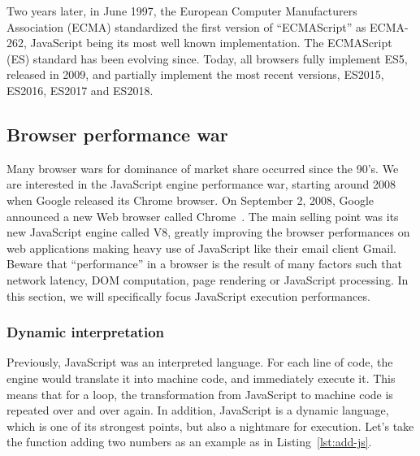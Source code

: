 Two years later, in June 1997, the European Computer Manufacturers Association
(ECMA) standardized the first version of ``ECMAScript'' as ECMA-262,
JavaScript being its most well known implementation.
The ECMAScript (ES) standard has been evolving since.
Today, all browsers fully implement ES5, released in 2009,
and partially implement the most recent versions, ES2015,
ES2016, ES2017 and ES2018.

\subsection{Browser performance war}%
\label{sub:browser_performance_war}

Many browser wars for dominance of market share occurred since the 90's.
We are interested in the JavaScript engine performance war,
starting around 2008 when Google released its Chrome browser.
On September 2, 2008, Google announced a new Web browser called Chrome~\cite{google-chrome}.
The main selling point was its new JavaScript engine called V8,
greatly improving the browser performances on web applications making
heavy use of JavaScript like their email client Gmail.
Beware that ``performance'' in a browser is the result of many factors
such that network latency, DOM computation, page rendering or JavaScript processing.
In this section, we will specifically focus JavaScript execution performances.

\subsubsection{Dynamic interpretation}%
\label{ssub:dynamic-interpretation}

Previously, JavaScript was an interpreted language.
For each line of code, the engine would translate it into machine code,
and immediately execute it.
This means that for a loop, the transformation from JavaScript to machine code
is repeated over and over again.
In addition, JavaScript is a dynamic language, which is one of its
strongest points, but also a nightmare for execution.
Let's take the function adding two numbers as an example
as in Listing~\ref{lst:add-js}.



